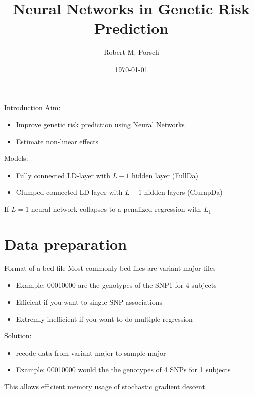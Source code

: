 \documentclass{beamer}
\title{Neural Networks in Genetic Risk Prediction}
\date{\today}
\author{Robert M. Porsch}
\institute{Center for Genomic Science}
\begin{document}
\maketitle

\begin{frame}[t]{Introduction}
  Aim:
  \begin{itemize}
    \item Improve genetic risk prediction using Neural Networks
    \item Estimate non-linear effects
  \end{itemize}
  Models:
  \begin{itemize}
    \item Fully connected LD-layer with $L-1$ hidden layer (FullDa)
    \item Clumped connected LD-layer with $L-1$ hidden layers (ClumpDa)
  \end{itemize}
  If $L=1$ neural network collapses to a penalized regression with $L_1$
\end{frame}

\section{Data preparation}

\begin{frame}[t]{Format of a bed file}
  Most commonly bed files are variant-major files
  \begin{itemize}
    \item Example: 00010000 are the genotypes of the SNP1 for 4 subjects
    \item Efficient if you want to single SNP associations
    \item Extremly inefficient if you want to do multiple regression
  \end{itemize}
  Solution:
  \begin{itemize}
    \item recode data from variant-major to sample-major
    \item Example: 00010000 would the the genotypes of 4 SNPs for 1 subjects
  \end{itemize}
  This allows efficient memory usage of stochastic gradient descent
\end{frame}
\end{document}
